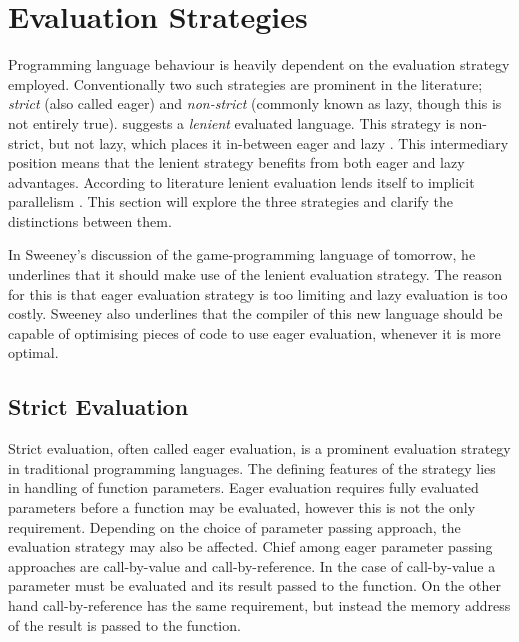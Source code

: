 \section{Evaluation Strategies}
Programming language behaviour is heavily dependent on the evaluation strategy employed. Conventionally two such strategies are prominent in the literature\cite{DBLP:journals/cl/Tremblay-lenient}; \textit{strict} (also called eager) and \textit{non-strict} (commonly known as lazy, though this is not entirely true). \cite{DBLP:journals/cl/Tremblay-lenient} suggests a \textit{lenient} evaluated language. This strategy is non-strict, but not lazy, which places it in-between eager and lazy \cite{DBLP:journals/cl/Tremblay-lenient}. This intermediary position means that the lenient strategy benefits from both eager and lazy advantages. According to literature lenient evaluation lends itself to implicit parallelism \cite{DBLP:journals/cl/Tremblay-parallel}. This section will explore the three strategies and clarify the distinctions between them.

In Sweeney's discussion of the game-programming language of tomorrow, he underlines that it should make use of the lenient evaluation strategy\cite{theNextMainstreanProgrammingLanguage}. The reason for this is that eager evaluation strategy is too limiting and lazy evaluation is too costly. Sweeney also underlines that the compiler of this new language should be capable of optimising pieces of code to use eager evaluation, whenever it is more optimal.

\subsection{Strict Evaluation}
Strict evaluation, often called eager evaluation, is a prominent evaluation strategy in traditional programming languages. The defining features of the strategy lies in handling of function parameters. Eager evaluation requires fully evaluated parameters before a function may be evaluated\cite[p.~103]{huttel2010transitions}, however this is not the only requirement. Depending on the choice of parameter passing approach, the evaluation strategy may also be affected. Chief among eager parameter passing approaches are call-by-value and call-by-reference. In the case of call-by-value a parameter must be evaluated and its result passed to the function. On the other hand call-by-reference has the same requirement, but instead the memory address of the result is passed to the function.

